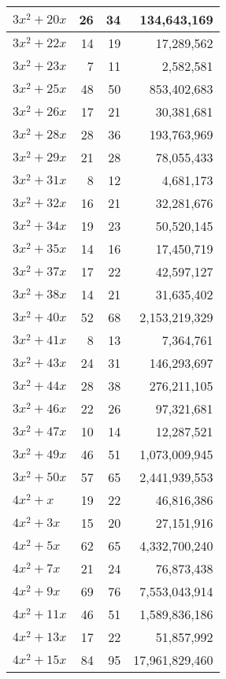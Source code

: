 \documentclass[a4paper]{amsproc}
\theoremstyle{plain}
\begin{document}
\begin{longtable}{ | l | r | r | r | }
$3x^2 + 20x$ & 26 & 34 & 134{,}643{,}169 \\ \hline
$3x^2 + 22x$ & 14 & 19 & 17{,}289{,}562 \\ \hline
$3x^2 + 23x$ & 7 & 11 & 2{,}582{,}581 \\ \hline
$3x^2 + 25x$ & 48 & 50 & 853{,}402{,}683 \\ \hline
$3x^2 + 26x$ & 17 & 21 & 30{,}381{,}681 \\ \hline
$3x^2 + 28x$ & 28 & 36 & 193{,}763{,}969 \\ \hline
$3x^2 + 29x$ & 21 & 28 & 78{,}055{,}433 \\ \hline
$3x^2 + 31x$ & 8 & 12 & 4{,}681{,}173 \\ \hline
$3x^2 + 32x$ & 16 & 21 & 32{,}281{,}676 \\ \hline
$3x^2 + 34x$ & 19 & 23 & 50{,}520{,}145 \\ \hline
$3x^2 + 35x$ & 14 & 16 & 17{,}450{,}719 \\ \hline
$3x^2 + 37x$ & 17 & 22 & 42{,}597{,}127 \\ \hline
$3x^2 + 38x$ & 14 & 21 & 31{,}635{,}402 \\ \hline
$3x^2 + 40x$ & 52 & 68 & 2{,}153{,}219{,}329 \\ \hline
$3x^2 + 41x$ & 8 & 13 & 7{,}364{,}761 \\ \hline
$3x^2 + 43x$ & 24 & 31 & 146{,}293{,}697 \\ \hline
$3x^2 + 44x$ & 28 & 38 & 276{,}211{,}105 \\ \hline
$3x^2 + 46x$ & 22 & 26 & 97{,}321{,}681 \\ \hline
$3x^2 + 47x$ & 10 & 14 & 12{,}287{,}521 \\ \hline
$3x^2 + 49x$ & 46 & 51 & 1{,}073{,}009{,}945 \\ \hline
$3x^2 + 50x$ & 57 & 65 & 2{,}441{,}939{,}553 \\ \hline
$4x^2 + x$ & 19 & 22 & 46{,}816{,}386 \\ \hline
$4x^2 + 3x$ & 15 & 20 & 27{,}151{,}916 \\ \hline
$4x^2 + 5x$ & 62 & 65 & 4{,}332{,}700{,}240 \\ \hline
$4x^2 + 7x$ & 21 & 24 & 76{,}873{,}438 \\ \hline
$4x^2 + 9x$ & 69 & 76 & 7{,}553{,}043{,}914 \\ \hline
$4x^2 + 11x$ & 46 & 51 & 1{,}589{,}836{,}186 \\ \hline
$4x^2 + 13x$ & 17 & 22 & 51{,}857{,}992 \\ \hline
$4x^2 + 15x$ & 84 & 95 & 17{,}961{,}829{,}460 \\ \hline

\end{longtable}
\end{document}
